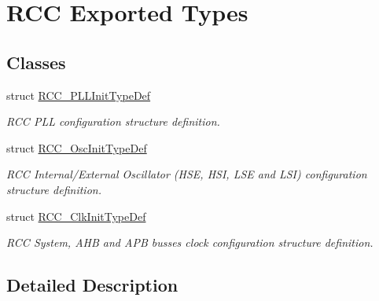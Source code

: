 \hypertarget{group___r_c_c___exported___types}{\section{R\-C\-C Exported Types}
\label{group___r_c_c___exported___types}
}
\subsection*{Classes}
\begin{DoxyCompactItemize}
\item 
struct \hyperlink{struct_r_c_c___p_l_l_init_type_def}{R\-C\-C\-\_\-\-P\-L\-L\-Init\-Type\-Def}
\begin{DoxyCompactList}\small\item\em R\-C\-C P\-L\-L configuration structure definition. \end{DoxyCompactList}\item 
struct \hyperlink{struct_r_c_c___osc_init_type_def}{R\-C\-C\-\_\-\-Osc\-Init\-Type\-Def}
\begin{DoxyCompactList}\small\item\em R\-C\-C Internal/\-External Oscillator (H\-S\-E, H\-S\-I, L\-S\-E and L\-S\-I) configuration structure definition. \end{DoxyCompactList}\item 
struct \hyperlink{struct_r_c_c___clk_init_type_def}{R\-C\-C\-\_\-\-Clk\-Init\-Type\-Def}
\begin{DoxyCompactList}\small\item\em R\-C\-C System, A\-H\-B and A\-P\-B busses clock configuration structure definition. \end{DoxyCompactList}\end{DoxyCompactItemize}


\subsection{Detailed Description}

